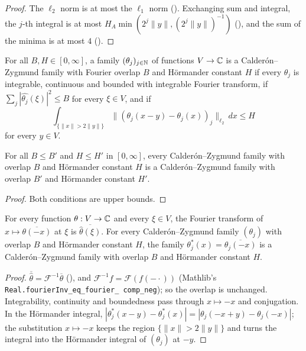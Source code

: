 \begin{proof}
\leanok
The $\ell_2$ norm is at most the $\ell_1$ norm (). Exchanging sum and integral,
the $j$-th integral is at most $H_A \min(2^j \|y\|, (2^j \|y\|)^{-1})$
(), and the sum of the minima is at most $4$
().
\end{proof}

\begin{definition}
\label{def:cz-family}
\leanok
{}
For all $B, H \in [0, \infty]$, a family $(\theta_j)_{j \in \mathbb{N}}$ of functions $V \to \mathbb{C}$ is a
Calder\'on--Zygmund family with Fourier overlap $B$ and H\"ormander constant $H$ if every
$\theta_j$ is integrable, continuous and bounded with integrable Fourier transform, if
$\sum_j |\widehat{\theta_j}(\xi)|^2 \leq B$ for every $\xi \in V$, and if
\[
  \int_{\{\|x\| > 2\|y\|\}} \|(\theta_j(x - y) - \theta_j(x))_j\|_{\ell_2} \, dx \leq H
\]
for every $y \in V$.
\end{definition}

\begin{lemma}
\label{lem:cz-family-mono}
\leanok
{}
For all $B \leq B'$ and $H \leq H'$ in $[0, \infty]$, every Calder\'on--Zygmund family with
overlap $B$ and H\"ormander constant $H$ is a Calder\'on--Zygmund family with overlap $B'$ and
H\"ormander constant $H'$.
\end{lemma}

\begin{proof}
\leanok
Both conditions are upper bounds.
\end{proof}

\begin{lemma}
\label{lem:cz-family-adjoint}
\leanok
{}
For every function $\theta : V \to \mathbb{C}$ and every $\xi \in V$, the Fourier transform of
$x \mapsto \overline{\theta(-x)}$ at $\xi$ is $\overline{\widehat\theta(\xi)}$. For every
Calder\'on--Zygmund family $(\theta_j)$ with overlap $B$ and H\"ormander constant $H$, the
family $\theta_j^*(x) = \overline{\theta_j(-x)}$ is a Calder\'on--Zygmund family with overlap
$B$ and H\"ormander constant $H$.
\end{lemma}

\begin{proof}
\leanok
$\overline{\widehat\theta} = \mathcal F^{-1} \overline\theta$ (),
and $\mathcal F^{-1} f = \mathcal F (f(-\cdot))$ (Mathlib's
\texttt{Real.\allowbreak fourierInv\_\allowbreak eq\_\allowbreak fourier\_\allowbreak
comp\_\allowbreak neg}); so the overlap is unchanged. Integrability, continuity and boundedness
pass through $x \mapsto -x$ and conjugation. In the H\"ormander integral,
$|\theta_j^*(x - y) - \theta_j^*(x)| = |\theta_j(-x + y) - \theta_j(-x)|$; the substitution
$x \mapsto -x$ keeps the region $\{\|x\| > 2\|y\|\}$ and turns the integral into the H\"ormander
integral of $(\theta_j)$ at $-y$.
\end{proof}

